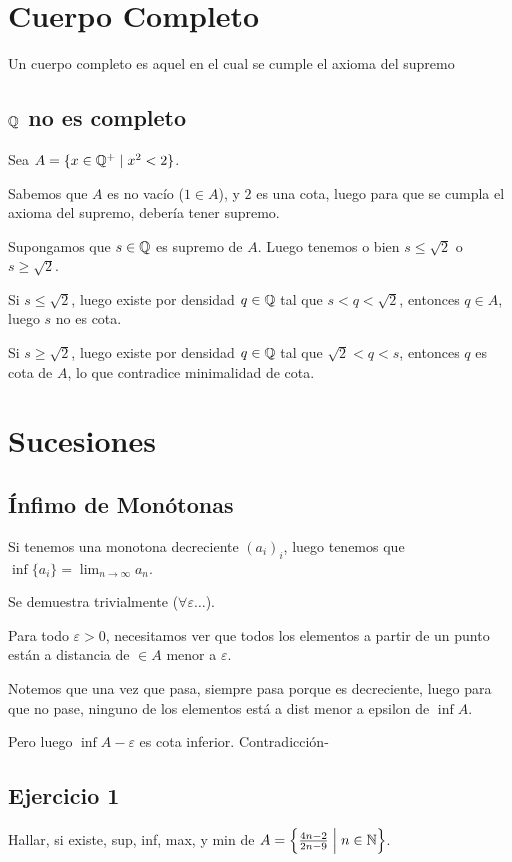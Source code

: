 \documentclass{article}
\begin{document}
	\section{Cuerpo Completo}
	Un cuerpo completo es aquel en el cual se cumple el axioma del supremo
	\subsection{$\mathbb{Q}$ no es completo}
	Sea $A = \{x \in \mathbb{Q}^+ \mid x^2 < 2\}$.

	Sabemos que $A$ es no vacío ($1 \in A$), y $2$ es una cota,
	luego para que se cumpla el axioma del supremo, debería tener supremo.

	Supongamos que $s \in \mathbb{Q}$ es supremo de $A$.
	Luego tenemos o bien $s \leq \sqrt{2}$ o $s \geq \sqrt{2}$.

	Si $s \leq \sqrt{2}$, luego existe por densidad $q \in \mathbb{Q}$ tal que $s < q < \sqrt{2}$,
	entonces $q \in A$, luego $s$ no es cota.

	Si $s \geq \sqrt{2}$, luego existe por densidad $q \in \mathbb{Q}$ tal que $\sqrt{2} < q < s$,
	entonces $q$ es cota de $A$, lo que contradice minimalidad de cota.

	\section{Sucesiones}
	\subsection{Ínfimo de Monótonas}
	Si tenemos una monotona decreciente $(a_i)_i$, luego tenemos que
	$\inf \{a_i\} = \lim_{n \to \infty} a_n$.

	Se demuestra trivialmente ($\forall \varepsilon \dots$).

	Para todo $\varepsilon > 0$, necesitamos ver que todos los elementos a partir de un
	punto están a distancia de $\in A$ menor a $\varepsilon$.

	Notemos que una vez que pasa, siempre pasa porque es decreciente, luego para
	que no pase, ninguno de los elementos está a dist menor a epsilon de $\inf A$.

	Pero luego $\inf A - \varepsilon$ es cota inferior. Contradicción-
	\subsection{Ejercicio 1}
	Hallar, si existe, sup, inf, max, y min de
	$A = \left\{\frac{4n-2}{2n-9} \;\middle| \; n \in \mathbb{N}\right\}$.
\end{document}
